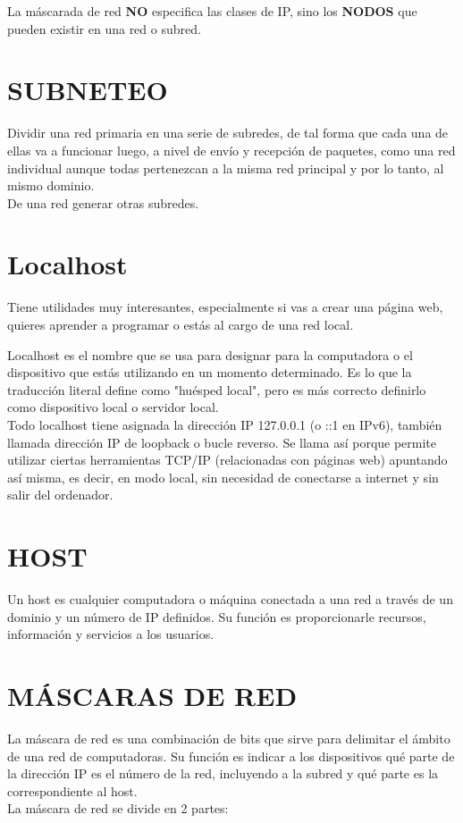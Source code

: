 \documentclass[letterpaper,12pt]{article}
\begin{document}
\begin{sloppypar}
La máscarada de red \textbf{NO} especifica las clases de IP, sino los \textbf{NODOS} que pueden existir en una red o subred.

\section{SUBNETEO}
Dividir una red primaria en una serie de subredes, de tal forma que cada una de ellas va a funcionar luego, a nivel de envío y recepción de paquetes, como una red individual aunque todas pertenezcan a la misma red principal y por lo tanto, al mismo dominio.
\vspace{0.3cm}\\ 
De una red generar otras subredes.

\section{Localhost}
Tiene utilidades muy interesantes, especialmente si vas a crear una página web, quieres aprender a programar o estás al cargo de una red local.

Localhost es el nombre que se usa para designar para la computadora o el dispositivo que estás utilizando en un momento determinado. Es lo que la traducción literal define como "huésped local", pero es más correcto definirlo como dispositivo local o servidor local.
\vspace{0.3cm}\\ 
Todo localhost tiene asignada la dirección IP 127.0.0.1 (o ::1 en IPv6), también llamada dirección IP de loopback o bucle reverso. Se llama así porque permite utilizar ciertas herramientas TCP/IP (relacionadas con páginas web) apuntando así misma, es decir, en modo local, sin necesidad de conectarse a internet y sin salir del ordenador.
\section{HOST}
Un host es cualquier computadora o máquina conectada a una red a través de un dominio y un número de IP definidos. Su función es proporcionarle recursos, información y servicios a los usuarios.
\newpage
\section{MÁSCARAS DE RED}
La máscara de red es una combinación de bits que sirve para delimitar el ámbito de una red de computadoras. Su función es indicar a los dispositivos qué parte de la dirección IP es el número de la red, incluyendo a la subred y qué parte es la correspondiente al host.
\vspace{0.3cm}\\ 
La máscara de red se divide en 2 partes:


\end{sloppypar}
\end{document}
